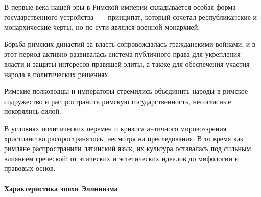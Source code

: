 В первые века нашей эры в Римской империи складывается особая форма государственного устройства~---~принципат, который сочетал республиканские и монархические черты, но по сути являлся военной монархией. 

Борьба римских династий за власть сопровождалась гражданскими войнами, и в этот период активно развивалась система публичного права для укрепления власти и защиты интересов правящей элиты, а также для обеспечения участия народа в политических решениях. 

Римские полководцы и императоры стремились объединить народы в римское содружество и распространить римскую государственность, несогласные покорялись силой. 

В условиях политических перемен и кризиса античного мировоззрения христианство распространялось, несмотря на преследования. В то время как римляне распространили латинский язык, их культура оставалась под сильным влиянием греческой: от этических и эстетических идеалов до мифологии и правовых основ.

\paragraph{Характеристика эпохи Эллинизма}

